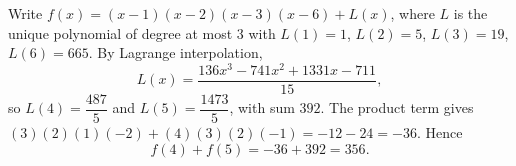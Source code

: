 Write $f(x)=(x-1)(x-2)(x-3)(x-6)+L(x)$, where $L$ is the unique polynomial of degree at most $3$ with $L(1)=1$, $L(2)=5$, $L(3)=19$, $L(6)=665$. By Lagrange interpolation,
\[L(x)=\dfrac{136x^3-741x^2+1331x-711}{15},\]
so $L(4)=\dfrac{487}{5}$ and $L(5)=\dfrac{1473}{5}$, with sum $392$. The product term gives $(3)(2)(1)(-2)+(4)(3)(2)(-1)=-12-24=-36$. Hence
\[f(4)+f(5)=-36+392=\boxed{356}.\]

